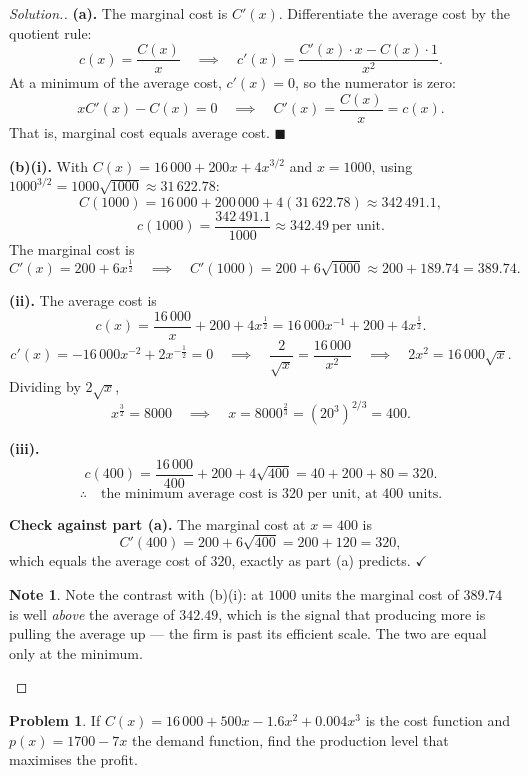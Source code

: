 \documentclass[11pt,a4paper]{article}
\theoremstyle{definition}
\newtheorem{note}[thm]{Note}
\newtheorem{problemx}{Problem}[section]
\newenvironment{problem}{\begin{problemx}}{\end{problemx}}
\newenvironment{solution}
  {\renewcommand{\qedsymbol}{}\begin{proof}[\textit{Solution}.]}
  {\end{proof}}
\let\amscheckmark\checkmark
\renewcommand{\checkmark}{\ensuremath{\amscheckmark}}
\begin{document}
\begin{solution}
\textbf{(a).} The marginal cost is $C'(x)$. Differentiate the average cost by the
quotient rule:
$$c(x)=\frac{C(x)}{x}\quad\implies\quad c'(x)=\frac{C'(x)\cdot x-C(x)\cdot 1}{x^2}.$$
At a minimum of the average cost, $c'(x)=0$, so the numerator is zero:
$$xC'(x)-C(x)=0\quad\implies\quad C'(x)=\frac{C(x)}{x}=c(x).$$
That is, marginal cost equals average cost. $\blacksquare$

\textbf{(b)(i).} With $C(x)=16\,000+200x+4x^{3/2}$ and $x=1000$, using
$1000^{3/2}=1000\sqrt{1000}\approx 31\,622.78$:
$$C(1000)=16\,000+200\,000+4(31\,622.78)\approx 342\,491.1,$$
$$c(1000)=\frac{342\,491.1}{1000}\approx 342.49\ \text{per unit}.$$
The marginal cost is
$$C'(x)=200+6x^{\frac{1}{2}}\quad\implies\quad C'(1000)=200+6\sqrt{1000}
\approx 200+189.74=389.74.$$

\textbf{(ii).} The average cost is
$$c(x)=\frac{16\,000}{x}+200+4x^{\frac{1}{2}}=16\,000x^{-1}+200+4x^{\frac{1}{2}}.$$
$$c'(x)=-16\,000x^{-2}+2x^{-\frac{1}{2}}=0\quad\implies\quad
\frac{2}{\sqrt{x}}=\frac{16\,000}{x^2}\quad\implies\quad 2x^2=16\,000\sqrt{x}.$$
Dividing by $2\sqrt{x}$,
$$x^{\frac{3}{2}}=8000\quad\implies\quad x=8000^{\frac{2}{3}}=\left(20^3\right)^{2/3}
=400.$$

\textbf{(iii).}
$$c(400)=\frac{16\,000}{400}+200+4\sqrt{400}=40+200+80=320.$$
$$\therefore\quad \text{the minimum average cost is } 320 \text{ per unit, at } 400
\text{ units}.$$

\textbf{Check against part (a).} The marginal cost at $x=400$ is
$$C'(400)=200+6\sqrt{400}=200+120=320,$$
which equals the average cost of $320$, exactly as part (a) predicts. $\checkmark$

\begin{note}
Note the contrast with (b)(i): at $1000$ units the marginal cost of $389.74$ is well
\emph{above} the average of $342.49$, which is the signal that producing more is pulling
the average up --- the firm is past its efficient scale. The two are equal only at the
minimum.
\end{note}
\end{solution}

\begin{problem}
If $C(x)=16\,000+500x-1.6x^2+0.004x^3$ is the cost function and $p(x)=1700-7x$ the
demand function, find the production level that maximises the profit.
\end{problem}
\end{document}
